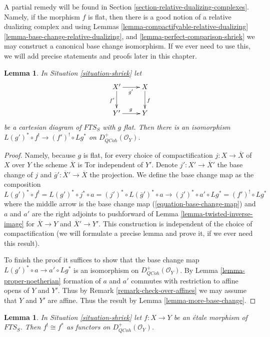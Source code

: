 \documentclass{stacks-project}
\theoremstyle{plain}
\newtheorem{lemma}[subsection]{Lemma}
\theoremstyle{definition}
\theoremstyle{remark}
\numberwithin{equation}{subsection}
\def\QCoh{\mathit{QCoh}}
\begin{document}
\medskip\noindent
A partial remedy will be found in
Section \ref{section-relative-dualizing-complexes}.
Namely, if the morphism $f$ is flat, then there is a good
notion of a relative dualizing complex and using
Lemmas \ref{lemma-compactifyable-relative-dualizing}
\ref{lemma-base-change-relative-dualizing},
and \ref{lemma-perfect-comparison-shriek}
we may construct a canonical base change isomorphism.
If we ever need to use this, we will add precise statements and
proofs later in this chapter.

\begin{lemma}
\label{lemma-base-change-shriek-flat}
In Situation \ref{situation-shriek} let
$$
\xymatrix{
X' \ar[r]_{g'} \ar[d]_{f'} & X \ar[d]^f \\
Y' \ar[r]^g & Y
}
$$
be a cartesian diagram of $\textit{FTS}_S$ with $g$ flat.
Then there is an isomorphism
$L(g')^* \circ f^! \to (f')^! \circ Lg^*$ on
$D_\QCoh^+(\mathcal{O}_Y)$.
\end{lemma}

\begin{proof}
Namely, because $g$ is flat, for every choice of
compactification $j : X \to \overline{X}$ of $X$ over $Y$
the scheme $\overline{X}$ is Tor independent of $Y'$.
Denote $j' : X' \to \overline{X}'$ the
base change of $j$ and $\overline{g}' : \overline{X}' \to \overline{X}$
the projection. We define the base change map as the composition
$$
L(g')^* \circ f^! = L(g')^* \circ j^* \circ a =
(j')^* \circ L(\overline{g}')^* \circ a \longrightarrow
(j')^* \circ a' \circ Lg^* = (f')^! \circ Lg^*
$$
where the middle arrow is the base change map
(\ref{equation-base-change-map})
and $a$ and $a'$ are the right adjoints to pushforward
of Lemma \ref{lemma-twisted-inverse-image}
for $\overline{X} \to Y$ and $\overline{X}' \to Y'$.
This construction is independent of the choice of
compactification (we will formulate a precise lemma
and prove it, if we ever need this result).

\medskip\noindent
To finish the proof it suffices to show that the base change
map $L(g')^* \circ a \to a' \circ Lg^*$ is an isomorphism
on $D_\QCoh^+(\mathcal{O}_Y)$.
By Lemma \ref{lemma-proper-noetherian} formation of $a$ and $a'$
commutes with restriction to affine opens of $Y$ and $Y'$.
Thus by Remark \ref{remark-check-over-affines}
we may assume that $Y$ and $Y'$ are affine.
Thus the result by Lemma \ref{lemma-more-base-change}.
\end{proof}

\begin{lemma}
\label{lemma-shriek-etale}
In Situation \ref{situation-shriek} let $f : X \to Y$ be an \'etale
morphism of $\textit{FTS}_S$. Then $f^! \cong f^*$ as functors on
$D^+_\QCoh(\mathcal{O}_Y)$.
\end{lemma}
\end{document}
